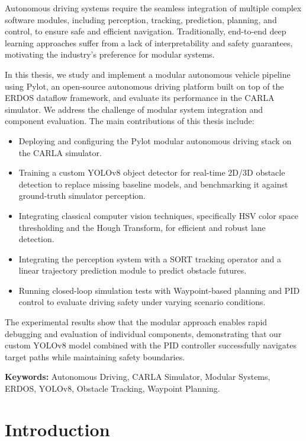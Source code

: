 \documentclass[11pt,a4paper]{report}
\begin{document}
Autonomous driving systems require the seamless integration of multiple complex software modules, including perception, tracking, prediction, planning, and control, to ensure safe and efficient navigation. Traditionally, end-to-end deep learning approaches suffer from a lack of interpretability and safety guarantees, motivating the industry's preference for modular systems. 

In this thesis, we study and implement a modular autonomous vehicle pipeline using Pylot, an open-source autonomous driving platform built on top of the ERDOS dataflow framework, and evaluate its performance in the CARLA simulator. We address the challenge of modular system integration and component evaluation. The main contributions of this thesis include:
\begin{itemize}
    \item Deploying and configuring the Pylot modular autonomous driving stack on the CARLA simulator.
    \item Training a custom YOLOv8 object detector for real-time 2D/3D obstacle detection to replace missing baseline models, and benchmarking it against ground-truth simulator perception.
    \item Integrating classical computer vision techniques, specifically HSV color space thresholding and the Hough Transform, for efficient and robust lane detection.
    \item Integrating the perception system with a SORT tracking operator and a linear trajectory prediction module to predict obstacle futures.
    \item Running closed-loop simulation tests with Waypoint-based planning and PID control to evaluate driving safety under varying scenario conditions.
\end{itemize}

The experimental results show that the modular approach enables rapid debugging and evaluation of individual components, demonstrating that our custom YOLOv8 model combined with the PID controller successfully navigates target paths while maintaining safety boundaries.

\textbf{Keywords:} Autonomous Driving, CARLA Simulator, Modular Systems, ERDOS, YOLOv8, Obstacle Tracking, Waypoint Planning.

\clearpage
{}
\setcounter{page}{1}
\chapter{Introduction}
\end{document}
